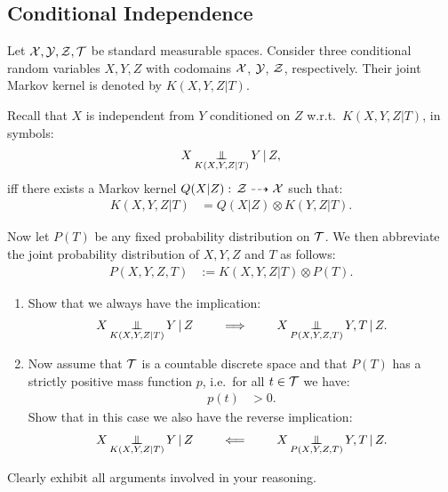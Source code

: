 \subsection{Conditional Independence}

Let $\mathcal{X},\mathcal{Y},\mathcal{Z},\mathcal{T}$ be standard measurable spaces.
Consider three conditional random variables $X,Y,Z$ with codomains $\mathcal{X}$, $\mathcal{Y}$, $\mathcal{Z}$, respectively.
Their joint Markov kernel is denoted by $K(X,Y,Z|T)$.

Recall that $X$ is independent from $Y$ conditioned on $Z$ w.r.t.\ $K(X,Y,Z|T)$, in symbols:
\begin{align}
    X \operatorname*{\perp\mkern-11mu\perp}_{K(X,Y,Z|T)} Y \operatorname*{|} Z,
\end{align}
iff there exists a Markov kernel $Q(X|Z) :\, \mathcal{Z} \dashrightarrow \mathcal{X}$ such that:
\begin{align}
    K(X,Y,Z|T) &= Q(X|Z) \otimes K(Y,Z|T).
\end{align}

Now let $P(T)$ be any fixed probability distribution on $\mathcal{T}$.
We then abbreviate the joint probability distribution of $X,Y,Z$ and $T$ as follows:
\begin{align}
    P(X,Y,Z,T) &:= K(X,Y,Z|T) \otimes P(T).
\end{align}


\begin{enumerate}[label=\alph*)]
    \item Show that we always have the implication: 
      \begin{align}
            X \operatorname*{\perp\mkern-11mu\perp}_{K(X,Y,Z|T)} Y \operatorname*{|} Z \qquad \implies \qquad X \operatorname*{\perp\mkern-11mu\perp}_{P(X,Y,Z,T)} Y,T \operatorname*{|} Z.
      \end{align}
  \item  Now assume that $\mathcal{T}$ is a countable discrete space and that $P(T)$ has a strictly positive mass function $p$, i.e.\ for all $t \in \mathcal{T}$ we have: 
\begin{align}
    p(t) & >0.
\end{align}
        Show that in this case we also have the reverse implication:
      \begin{align}
            X \operatorname*{\perp\mkern-11mu\perp}_{K(X,Y,Z|T)} Y \operatorname*{|} Z \qquad \impliedby \qquad X \operatorname*{\perp\mkern-11mu\perp}_{P(X,Y,Z,T)} Y,T \operatorname*{|} Z.
      \end{align}
\end{enumerate}   
Clearly exhibit all arguments involved in your reasoning. 


